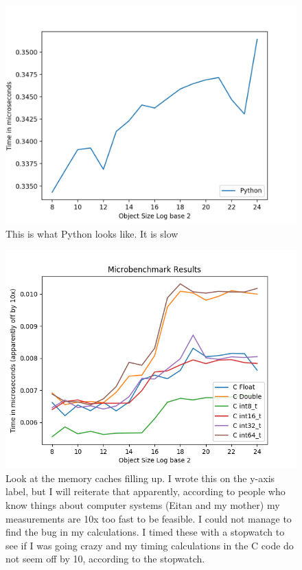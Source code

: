 \documentclass[12pt]{article}
\begin{document}
\begin{enumerate}
\pagebreak
\end{enumerate}

\begin{figure}
\centering
\includegraphics[width=\linewidth]{Python_Results.png}
\caption{This is what Python looks like. It is slow}
\end{figure}

\begin{figure}
\centering
\includegraphics[width=\linewidth]{All_C_Results.png}
\caption{Look at the memory caches filling up. I wrote this on the y-axis label, but I will reiterate that apparently, according to people who know things about computer systems (Eitan and my mother) my measurements are 10x too fast to be feasible. I could not manage to find the bug in my calculations. I timed these with a stopwatch to see if I was going crazy and my timing calculations in the C code do not seem off by 10, according to the stopwatch.}
\end{figure}
\end{document}
